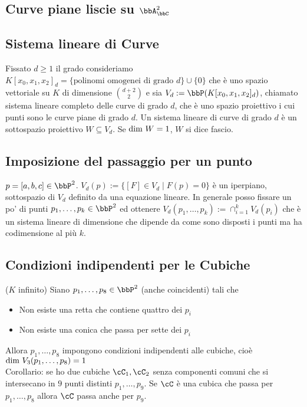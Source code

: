\documentclass[a4paper,NoNotes,GeneralMath]{stdmdoc}
\begin{document}
	\subsection*{Curve piane liscie su $\bbA^2_\bbC$}
	
	\subsection*{Sistema lineare di Curve}
	Fissato $d \ge 1$ il grado consideriamo $K[x_0, x_1, x_2]_d = \{ \text{polinomi omogenei di grado } d \} \cup \{ 0 \}$ che è uno spazio vettoriale su $K$ di dimensione $\binom{d+2}{2}$ e sia $V_d := \bbP ( K[x_0,x_1,x_2]_d )$, chiamato sistema lineare completo delle curve di grado $d$, che è uno spazio proiettivo i cui punti sono le curve piane di grado $d$. Un sistema lineare di curve di grado $d$ è un sottospazio proiettivo $W \subseteq V_d$. Se $\mbox{dim } W = 1$, $W$ si dice fascio.
	
	\subsection*{Imposizione del passaggio per un punto}
	$p = [a,b,c] \in \bbP^2$. $V_d (p) := \{ [F] \in V_d \mid F(p) = 0 \}$ è un iperpiano, sottospazio di $V_d$ definito da una equazione lineare. In generale posso fissare un po' di punti $p_1, \ldots, p_k \in \bbP^2$ ed ottenere $V_d(p_1, \ldots, p_k) := \cap_{i=1}^k V_d(p_i)$ che è un sistema lineare di dimensione che dipende da come sono disposti i punti ma ha codimensione al più $k$.
	
	\subsection*{Condizioni indipendenti per le Cubiche}
	($K$ infinito) Siano $p_1, \ldots, p_8 \in \bbP^2$ (anche coincidenti) tali che
	\begin{itemize}
		\item Non esiste una retta che contiene quattro dei $p_i$
		\item Non esiste una conica che passa per sette dei $p_i$
	\end{itemize}
	Allora $p_1, \ldots, p_8$ impongono condizioni indipendenti alle cubiche, cioè $\mbox{dim } V_3(p_1, \ldots, p_8) = 1$ \\
	Corollario: se ho due cubiche $\cC_1, \cC_2$ senza componenti comuni che si intersecano in $9$ punti distinti $p_1, \ldots, p_9$. Se $\cC$ è una cubica che passa per $p_1, \ldots, p_8$ allora $\cC$ passa anche per $p_9$.
	
\end{document}
